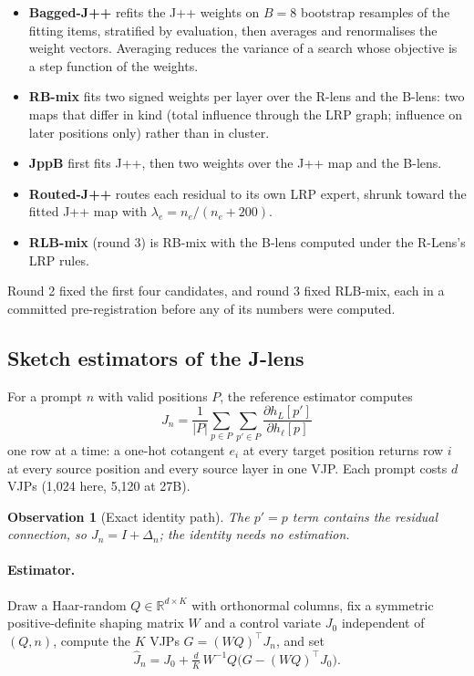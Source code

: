 \documentclass[11pt]{article}
\newtheorem{observation}{Observation}
\theoremstyle{definition}
\newcommand{\R}{\mathbb{R}}
\begin{document}
\begin{itemize}
\item \textbf{Bagged-J++} refits the J++ weights on $B=8$ bootstrap resamples of the fitting items,
stratified by evaluation, then averages and renormalises the weight vectors. Averaging reduces the
variance of a search whose objective is a step function of the weights.
\item \textbf{RB-mix} fits two signed weights per layer over the R-lens and the B-lens: two maps that
differ in kind (total influence through the LRP graph; influence on later positions only) rather than
in cluster.
\item \textbf{JppB} first fits J++, then two weights over the J++ map and the B-lens.
\item \textbf{Routed-J++} routes each residual to its own LRP expert, shrunk toward the fitted J++
map with $\lambda_e=n_e/(n_e+200)$.
\item \textbf{RLB-mix} (round 3) is RB-mix with the B-lens computed under the R-Lens's LRP rules.
\end{itemize}
Round 2 fixed the first four candidates, and round 3 fixed RLB-mix, each in a committed
pre-registration before any of its numbers were computed.

\subsection{Sketch estimators of the J-lens}
\label{sec:sketchmethod}

For a prompt $n$ with valid positions $P$, the reference estimator computes
\begin{equation*}
J_n=\frac{1}{|P|}\sum_{p\in P}\sum_{p'\in P}\frac{\partial h_L[p']}{\partial h_\ell[p]}
\end{equation*}
one row at a time: a one-hot cotangent $e_i$ at every target position returns row $i$ at every source position and every
source layer in one VJP. Each prompt costs $d$ VJPs (1,024 here, 5,120 at 27B).

\begin{observation}[Exact identity path]
The $p'=p$ term contains the residual connection, so $J_n=I+\Delta_n$; the identity needs no
estimation.
\end{observation}

\paragraph{Estimator.} Draw a Haar-random $Q\in\R^{d\times K}$ with orthonormal columns, fix a
symmetric positive-definite shaping matrix $W$ and a control variate $J_0$ independent of $(Q,n)$,
compute the $K$ VJPs $G=(WQ)^{\top}J_n$, and set
\begin{equation}
\hat J_n = J_0 + \tfrac{d}{K}\,W^{-1}Q\big(G-(WQ)^{\top}J_0\big).
\end{equation}
\end{document}
